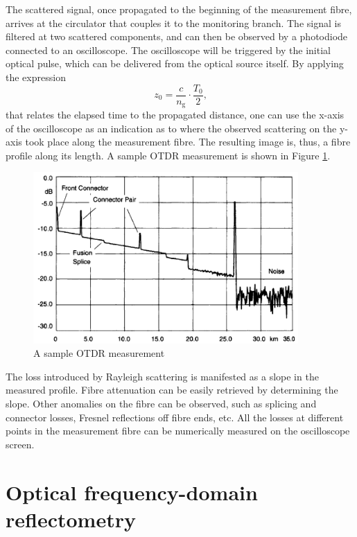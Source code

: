 \documentclass{standalone}
\begin{document}
The scattered signal, once propagated to the beginning of the measurement fibre, arrives at the circulator that couples it to the monitoring branch. The signal is filtered at two scattered components, and can then be observed by a photodiode connected to an oscilloscope. The oscilloscope will be triggered by the initial optical pulse, which can be delivered from the optical source itself. By applying the expression 
\begin{equation} \label{eq:otdr_time_distance}
z_0 = \frac{c}{n_\textrm{g}} \cdot \frac{T_0}{2} \textrm{,}
\end{equation}
that relates the elapsed time to the propagated distance, one can use the x-axis of the oscilloscope as an indication as to where the observed scattering on the y-axis took place along the measurement fibre. The resulting image is, thus, a fibre profile along its length. A sample OTDR measurement is shown in Figure \ref{fig:otdr_sample}.
\begin{figure}[h]
	\centering
	\includegraphics[width=0.9\textwidth]{otdr_sample.png}
	\caption{A sample OTDR measurement \cite{fer:oks}}
	\label{fig:otdr_sample}
\end{figure}
The loss introduced by Rayleigh scattering is manifested as a slope in the measured profile. Fibre attenuation can be easily retrieved by determining the slope. Other anomalies on the fibre can be observed, such as splicing and connector losses, Fresnel reflections off fibre ends, etc. All the losses at different points in the measurement fibre can be numerically measured on the oscilloscope screen.\\


\section{Optical frequency-domain reflectometry}
\end{document}
